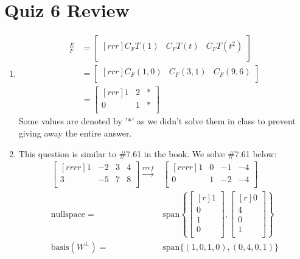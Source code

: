 \documentclass{report}
\begin{document}
\section{Quiz 6 Review}
\begin{enumerate}
\item
\begin{align*}
[T]_F^E&=\begin{bmatrix}[rrr]C_FT(1)&C_FT(t)&C_FT(t^2)\\\end{bmatrix}\\
&=\begin{bmatrix}[rrr]C_F(1,0)&C_F(3,1)&C_F(9,6)\\\end{bmatrix}\\
&=\begin{bmatrix}[rrr]1&2&*\\0&1&*\\\end{bmatrix}
\end{align*}
Some values are denoted by '*' as we didn't solve them in class to prevent giving away the entire answer.

\item This question is similar to \#7.61 in the book. We solve \#7.61 below: 
\begin{align*}
\begin{bmatrix}[rrrr]1&-2&3&4\\3&-5&7&8\\\end{bmatrix} \xrightarrow[]{rref}& \begin{bmatrix}[rrrr]1&0&-1&-4\\0&1&-2&-4\\\end{bmatrix}\\
\mathrm{nullspace}=&\mathrm{span}\left\{\begin{bmatrix}[r]1\\0\\1\\0\\\end{bmatrix},\begin{bmatrix}[r]0\\4\\0\\1\\\end{bmatrix}\right\}\\
\mathrm{basis}(W^\perp)=&\mathrm{span}\{(1,0,1,0),(0,4,0,1)\}
\end{align*}
\end{enumerate}
\end{document}
